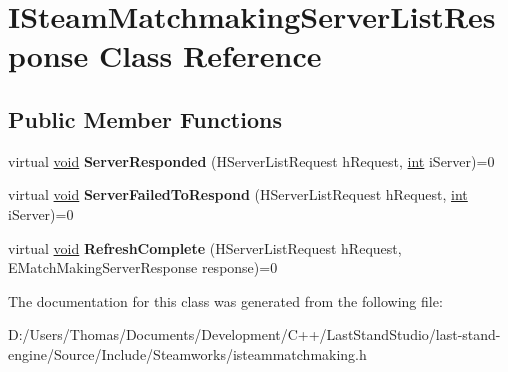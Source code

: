 \hypertarget{classISteamMatchmakingServerListResponse}{}\section{I\+Steam\+Matchmaking\+Server\+List\+Response Class Reference}
\label{classISteamMatchmakingServerListResponse}
\subsection*{Public Member Functions}
\begin{DoxyCompactItemize}
\item 
\hypertarget{classISteamMatchmakingServerListResponse_a84943bac8948e9bc187e83b26016512b}{}virtual \hyperlink{SDL__audio_8h_a52835ae37c4bb905b903cbaf5d04b05f}{void} {\bfseries Server\+Responded} (H\+Server\+List\+Request h\+Request, \hyperlink{SDL__thread_8h_a6a64f9be4433e4de6e2f2f548cf3c08e}{int} i\+Server)=0\label{classISteamMatchmakingServerListResponse_a84943bac8948e9bc187e83b26016512b}

\item 
\hypertarget{classISteamMatchmakingServerListResponse_abfdc3be88438c2a0cef2b323e61221c1}{}virtual \hyperlink{SDL__audio_8h_a52835ae37c4bb905b903cbaf5d04b05f}{void} {\bfseries Server\+Failed\+To\+Respond} (H\+Server\+List\+Request h\+Request, \hyperlink{SDL__thread_8h_a6a64f9be4433e4de6e2f2f548cf3c08e}{int} i\+Server)=0\label{classISteamMatchmakingServerListResponse_abfdc3be88438c2a0cef2b323e61221c1}

\item 
\hypertarget{classISteamMatchmakingServerListResponse_a1f2906cd276b437d44a817438ad9f1c1}{}virtual \hyperlink{SDL__audio_8h_a52835ae37c4bb905b903cbaf5d04b05f}{void} {\bfseries Refresh\+Complete} (H\+Server\+List\+Request h\+Request, E\+Match\+Making\+Server\+Response response)=0\label{classISteamMatchmakingServerListResponse_a1f2906cd276b437d44a817438ad9f1c1}

\end{DoxyCompactItemize}


The documentation for this class was generated from the following file\+:\begin{DoxyCompactItemize}
\item 
D\+:/\+Users/\+Thomas/\+Documents/\+Development/\+C++/\+Last\+Stand\+Studio/last-\/stand-\/engine/\+Source/\+Include/\+Steamworks/isteammatchmaking.\+h\end{DoxyCompactItemize}
